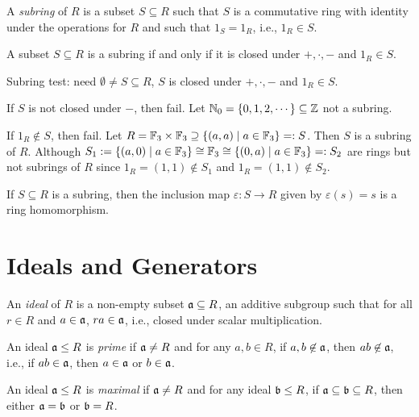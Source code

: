 \begin{definition}\label{1.5}
    A \emph{subring} of $R$ is a subset $S \subseteq R$ such that $S$ is a commutative ring with identity under the operations for $R$ and such that $1_S = 1_R$, i.e., $1_R \in S$.
\end{definition}

\begin{fact}\label{1.6}
    A subset $S \subseteq R$ is a subring if and only if it is closed under $+,\cdot,-$ and $1_R \in S$.
\end{fact}

\begin{example}\label{1.7}
    Subring test: need $\emptyset \neq S \subseteq R$, $S$ is closed under $+,\cdot,-$ and $1_R \in S$. \par
    If $S$ is not closed under $-$, then fail. Let $\mathbb{N}_0 = \{0,1,2,\cdots\} \subseteq \mathbb{Z}$ not a subring. \par
    If $1_R \not \in S$, then fail. Let $R = \mathbb{F}_3 \times \mathbb{F}_3 \supseteq \{(a,a) \mid a \in \mathbb{F}_3\} =: S$. Then $S$ is a subring of $R$. Although $S_1 := \{(a,0) \mid a \in \mathbb{F}_3\} \cong \mathbb{F}_3 \cong \{(0,a) \mid a \in \mathbb{F}_3\} =: S_2$ are rings but not subrings of $R$ since $1_R = (1,1) \not \in S_1$ and $1_R = (1,1) \not \in S_2$. 
\end{example}

\begin{fact}\label{1.8}
    If $S \subseteq R$ is a subring, then the inclusion map $\varepsilon: S \to R$ given by $\varepsilon(s) = s$ is a ring homomorphism.
\end{fact}

\section*{Ideals and Generators}

\begin{definition}\label{1.9}
    An \emph{ideal} of $R$ is a non-empty subset $\mathfrak{a} \subseteq R$, an additive subgroup such that for all $r \in R$ and $a \in \mathfrak{a}$, $ra \in \mathfrak{a}$, i.e., closed under scalar multiplication. \par
    An ideal $\mathfrak{a} \leq R$ is \emph{prime} if $\mathfrak{a} \neq R$ and for any $a,b \in R$, if $a,b \not \in \mathfrak{a}$, then $ab \not \in \mathfrak{a}$, i.e., if $ab \in \mathfrak{a}$, then $a \in \mathfrak{a}$ or $b \in \mathfrak{a}$. \par
    An ideal $\mathfrak{a} \leq R$ is \emph{maximal} if $\mathfrak{a} \neq R$ and for any ideal $\mathfrak{b} \leq R$, if $\mathfrak{a} \subseteq \mathfrak{b} \subseteq R$, then either $\mathfrak{a} = \mathfrak{b}$ or $\mathfrak{b} = R$.
\end{definition}


